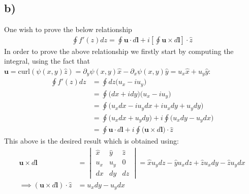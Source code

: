 \documentclass{article}
\begin{document}
\subsection*{b)}
One wish to prove the below relationship
\begin{align*}
    \oint f'(z)dz = \oint \mathbf{u}\cdot d\mathbf{l} + i\left[\oint \mathbf{u}\times d\mathbf{l}\right]\cdot \hat{z}
\end{align*}
In order to prove the above relationship we firstly start by computing the integral, using the fact that $\mathbf{u}=\text{curl}(\psi(x,y)\hat{z}) = \partial_y\psi(x,y)\hat{x}-\partial_x\psi(x,y)\hat{y} = u_x\hat{x}+u_y\hat{y}$:
\begin{align*}
    \oint f'(z)dz &= \oint dz\Big(u_x - iu_y\Big)\\
    &=\oint\Big(dx + idy\Big)\Big(u_x - iu_y\Big)\\
    &=\oint \Big(u_x dx -iu_ydx + iu_x dy + u_y dy\Big)\\
    &=\oint \Big(u_x dx + u_y dy\Big) + i \oint \Big(u_xdy - u_ydx \Big)\\
    &=\oint \mathbf{u}\cdot d\mathbf{l} + i\oint \Big(\mathbf{u}\times d\mathbf{l}\Big)\cdot \hat{z}
\end{align*}
This above is the desired result which is obtained using:
\begin{align*}
    \mathbf{u}\times d\mathbf{l} &= \begin{vmatrix}
        \hat{x}&\hat{y}&\hat{z}\\
        u_x&u_y&0\\
        dx&dy&dz
    \end{vmatrix} =\hat{x}u_ydz - \hat{y}u_xdz + \hat{z}u_xdy - \hat{z}u_ydx\\
    \implies (\mathbf{u}\times d\mathbf{l})\cdot \hat{z} &= u_xdy - u_ydx
\end{align*}
\end{document}
